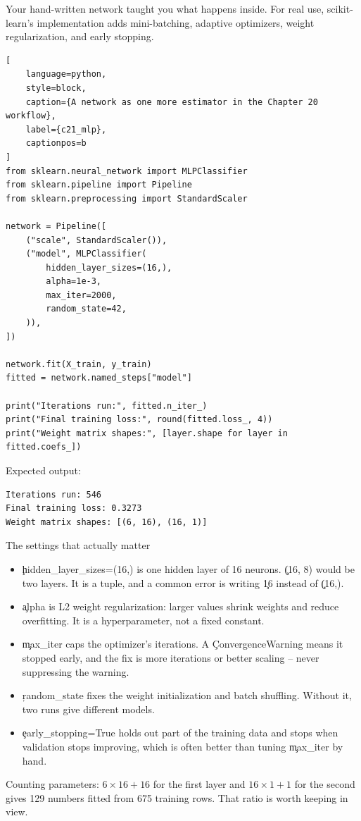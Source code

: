 
Your hand-written network taught you what happens inside. For real use,
scikit-learn's implementation adds mini-batching, adaptive optimizers, weight
regularization, and early stopping.

\begin{lstlisting}[
    language=python,
    style=block,
    caption={A network as one more estimator in the Chapter 20 workflow},
    label={c21_mlp},
    captionpos=b
]
from sklearn.neural_network import MLPClassifier
from sklearn.pipeline import Pipeline
from sklearn.preprocessing import StandardScaler

network = Pipeline([
    ("scale", StandardScaler()),
    ("model", MLPClassifier(
        hidden_layer_sizes=(16,),
        alpha=1e-3,
        max_iter=2000,
        random_state=42,
    )),
])

network.fit(X_train, y_train)
fitted = network.named_steps["model"]

print("Iterations run:", fitted.n_iter_)
print("Final training loss:", round(fitted.loss_, 4))
print("Weight matrix shapes:", [layer.shape for layer in fitted.coefs_])
\end{lstlisting}

Expected output:

\begin{lstlisting}[language=text, style=block, caption={A 129-parameter network}, label={c21_mlp_output}, captionpos=b]
Iterations run: 546
Final training loss: 0.3273
Weight matrix shapes: [(6, 16), (16, 1)]
\end{lstlisting}

\begin{SyntaxBox}{The settings that actually matter}
\begin{itemize}
    \item \c{hidden_layer_sizes=(16,)} is one hidden layer of 16 neurons.
          \c{(16, 8)} would be two layers. It is a tuple, and a common error is
          writing \c{16} instead of \c{(16,)}.
    \item \c{alpha} is L2 weight regularization: larger values shrink weights and
          reduce overfitting. It is a hyperparameter, not a fixed constant.
    \item \c{max_iter} caps the optimizer's iterations. A
          \c{ConvergenceWarning} means it stopped early, and the fix is more
          iterations or better scaling -- never suppressing the warning.
    \item \c{random_state} fixes the weight initialization and batch shuffling.
          Without it, two runs give different models.
    \item \c{early_stopping=True} holds out part of the training data and stops
          when validation stops improving, which is often better than tuning
          \c{max_iter} by hand.
\end{itemize}
Counting parameters: $6 \times 16 + 16$ for the first layer and
$16 \times 1 + 1$ for the second gives 129 numbers fitted from 675 training rows.
That ratio is worth keeping in view.
\end{SyntaxBox}

